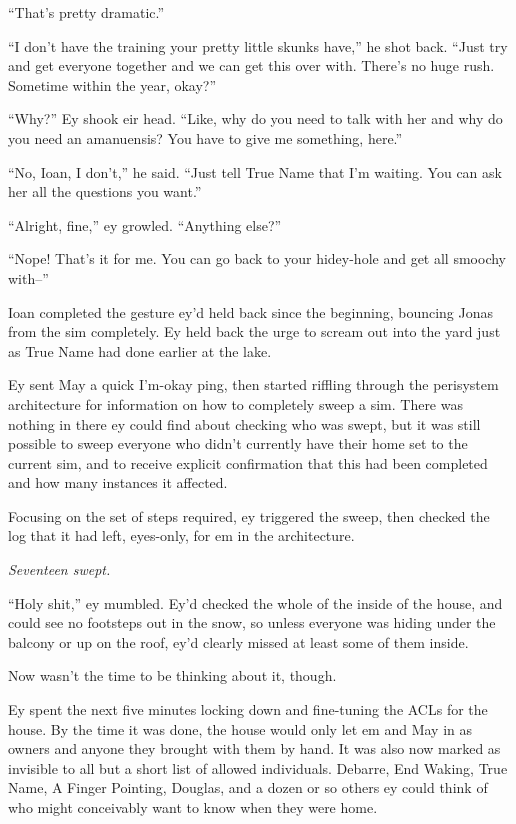 ``That's pretty dramatic.''

``I don't have the training your pretty little skunks have,'' he shot back. ``Just try and get everyone together and we can get this over with. There's no huge rush. Sometime within the year, okay?''

``Why?'' Ey shook eir head. ``Like, why do you need to talk with her and why do you need an amanuensis? You have to give me something, here.''

``No, Ioan, I don't,'' he said. ``Just tell True Name that I'm waiting. You can ask her all the questions you want.''

``Alright, fine,'' ey growled. ``Anything else?''

``Nope! That's it for me. You can go back to your hidey-hole and get all smoochy with--''

Ioan completed the gesture ey'd held back since the beginning, bouncing Jonas from the sim completely. Ey held back the urge to scream out into the yard just as True Name had done earlier at the lake.

Ey sent May a quick I'm-okay ping, then started riffling through the perisystem architecture for information on how to completely sweep a sim. There was nothing in there ey could find about checking who was swept, but it was still possible to sweep everyone who didn't currently have their home set to the current sim, and to receive explicit confirmation that this had been completed and how many instances it affected.

Focusing on the set of steps required, ey triggered the sweep, then checked the log that it had left, eyes-only, for em in the architecture.

\emph{Seventeen swept.}

``Holy shit,'' ey mumbled. Ey'd checked the whole of the inside of the house, and could see no footsteps out in the snow, so unless everyone was hiding under the balcony or up on the roof, ey'd clearly missed at least some of them inside.

Now wasn't the time to be thinking about it, though.

Ey spent the next five minutes locking down and fine-tuning the ACLs for the house. By the time it was done, the house would only let em and May in as owners and anyone they brought with them by hand. It was also now marked as invisible to all but a short list of allowed individuals. Debarre, End Waking, True Name, A Finger Pointing, Douglas, and a dozen or so others ey could think of who might conceivably want to know when they were home.

